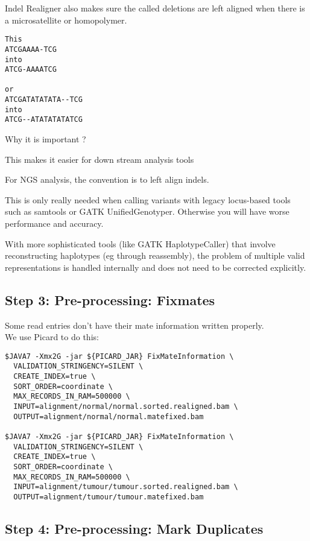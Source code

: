 Indel Realigner also makes sure the called deletions are left aligned when there is a microsatellite or homopolymer.

\begin{verbatim}
This
ATCGAAAA-TCG
into
ATCG-AAAATCG

or
ATCGATATATATA--TCG
into
ATCG--ATATATATATCG
\end{verbatim}


\begin{questions} 
Why it is important ? 
\end{questions}
\begin{answer}
This makes it easier for down stream analysis tools

For NGS analysis, the convention is to left align indels. 

This is only really needed when calling variants with legacy locus-based tools such as samtools or GATK UnifiedGenotyper. Otherwise you will have worse performance and accuracy.

With more sophisticated tools (like GATK HaplotypeCaller) that involve reconstructing haplotypes (eg through reassembly), the problem of multiple valid representations is handled internally and does not need to be corrected explicitly.
\end{answer}

\subsection{Step 3: Pre-processing: Fixmates}

Some read entries don't have their mate information written properly. \\
We use Picard to do this: 

\begin{lstlisting}
$JAVA7 -Xmx2G -jar ${PICARD_JAR} FixMateInformation \
  VALIDATION_STRINGENCY=SILENT \
  CREATE_INDEX=true \
  SORT_ORDER=coordinate \
  MAX_RECORDS_IN_RAM=500000 \
  INPUT=alignment/normal/normal.sorted.realigned.bam \
  OUTPUT=alignment/normal/normal.matefixed.bam

$JAVA7 -Xmx2G -jar ${PICARD_JAR} FixMateInformation \
  VALIDATION_STRINGENCY=SILENT \
  CREATE_INDEX=true \
  SORT_ORDER=coordinate \
  MAX_RECORDS_IN_RAM=500000 \
  INPUT=alignment/tumour/tumour.sorted.realigned.bam \
  OUTPUT=alignment/tumour/tumour.matefixed.bam

\end{lstlisting}

\subsection{Step 4: Pre-processing: Mark Duplicates}


